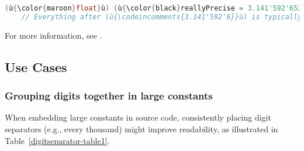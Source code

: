 \begin{lstlisting}[language=C++]
(ù{\color{maroon}float}ù) (ù{\color{black}reallyPrecise = 3.141'592'653'589'793'238'462'643'383'279'502'884;}ù)  // OK
    // Everything after (ù{\codeincomments{3.141'592'6}}ù) is typically ignored silently.
\end{lstlisting}
    
\noindent For more information, see .

\subsection[Use Cases]{Use Cases}\label{use-cases}

\subsubsection[Grouping digits together in large constants]{Grouping digits together in large constants}\label{grouping-digits-together-in-large-constants}

When embedding large constants in source code, consistently placing
digit separators (e.g., every thousand) might improve readability, as
illustrated in Table~\ref{digitseparator-table1}.

